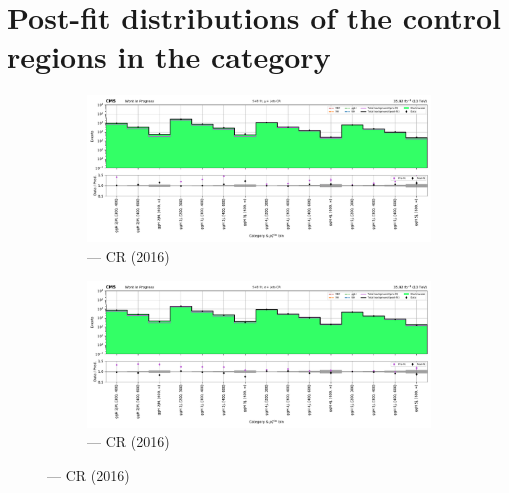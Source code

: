 \clearpage




\section{Post-fit distributions of the control regions in the \texorpdfstring{\ggH}{ggH} category}
\label{sec:pre_post_fit_plots_ggF_CRs}

\begin{figure}[htbp]
    \centering
    \begin{subfigure}[b]{0.49\textwidth}
        \includegraphics[width=\textwidth]{chapters/higgstoinv/figures/mountain_ranges/2016/ggF/Wmunu_tree_fit_s-abs_values_ggF_cats.pdf}
        \caption{\ggH --- \singleMuCr \gls{CR} (2016)}
    \end{subfigure}
    \hfill
    \begin{subfigure}[b]{0.49\textwidth}
        \includegraphics[width=\textwidth]{chapters/higgstoinv/figures/mountain_ranges/2016/ggF/Wenu_tree_fit_s-abs_values_ggF_cats.pdf}
        \caption{\ggH --- \singleEleCr \gls{CR} (2016)}
    \end{subfigure}


\end{figure}

